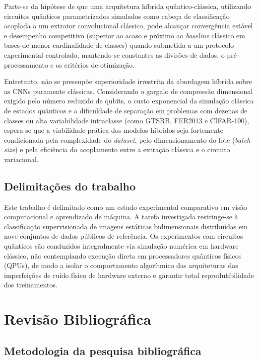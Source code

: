 \documentclass[
    12pt,
    openright,
    oneside,
    a4paper,
    english,
    brazil
]{abntex2}
\begin{document}
Parte-se da hipótese de que uma arquitetura híbrida quântico-clássica, utilizando circuitos quânticos parametrizados simulados como cabeça de classificação acoplada a um extrator convolucional clássico, pode alcançar convergência estável e desempenho competitivo (superior ao acaso e próximo ao \textit{baseline} clássico em bases de menor cardinalidade de classes) quando submetida a um protocolo experimental controlado, mantendo-se constantes as divisões de dados, o pré-processamento e os critérios de otimização.

Entretanto, não se pressupõe superioridade irrestrita da abordagem híbrida sobre as CNNs puramente clássicas. Considerando o gargalo de compressão dimensional exigido pelo número reduzido de qubits, o custo exponencial da simulação clássica de estados quânticos e a dificuldade de separação em problemas com dezenas de classes ou alta variabilidade intraclasse (como GTSRB, FER2013 e CIFAR-100), espera-se que a viabilidade prática dos modelos híbridos seja fortemente condicionada pela complexidade do \textit{dataset}, pelo dimensionamento do lote (\textit{batch size}) e pela eficiência do acoplamento entre a extração clássica e o circuito variacional.

\section{Delimitações do trabalho}

Este trabalho é delimitado como um estudo experimental comparativo em visão computacional e aprendizado de máquina. A tarefa investigada restringe-se à classificação supervisionada de imagens estáticas bidimensionais distribuídas em nove conjuntos de dados públicos de referência. Os experimentos com circuitos quânticos são conduzidos integralmente via simulação numérica em hardware clássico, não contemplando execução direta em processadores quânticos físicos (QPUs), de modo a isolar o comportamento algorítmico das arquiteturas das imperfeições de ruído físico de hardware externo e garantir total reprodutibilidade dos treinamentos.

\chapter{Revisão Bibliográfica}

\section{Metodologia da pesquisa bibliográfica}
\end{document}
